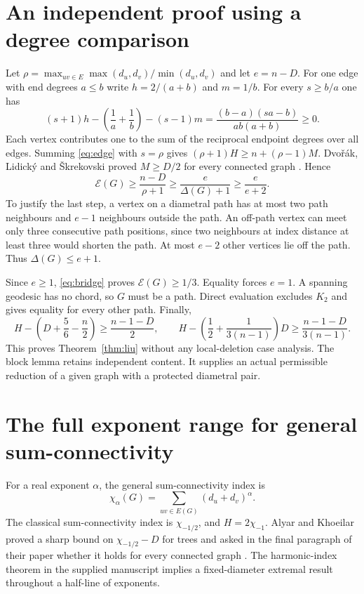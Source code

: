 \documentclass[11pt,a4paper]{article}
\newcommand{\gap}{\mathcal{E}}
\begin{document}
\section{An independent proof using a degree comparison}\label{sec:indep}
Let $\rho=\max_{uv\in E}\max(d_u,d_v)/\min(d_u,d_v)$ and let $e=n-D$. For one edge with end degrees $a\le b$ write $h=2/(a+b)$ and $m=1/b$. For every $s\ge b/a$ one has
\begin{equation}\label{eq:edge}
 (s+1)h-\left(\frac1a+\frac1b\right)-(s-1)m
 =\frac{(b-a)(sa-b)}{ab(a+b)}\ge0 .
\end{equation}
Each vertex contributes one to the sum of the reciprocal endpoint degrees over all edges. Summing \eqref{eq:edge} with $s=\rho$ gives $(\rho+1)H\ge n+(\rho-1)M$. Dvo\v r\'ak, Lidick\'y and \v Skrekovski proved $M\ge D/2$ for every connected graph \cite[Thm.~3]{dls}. Hence
\begin{equation}\label{eq:bridge}
 \gap(G)\ge\frac{n-D}{\rho+1}\ge\frac{e}{\Delta(G)+1}\ge\frac{e}{e+2}.
\end{equation}
To justify the last step, a vertex on a diametral path has at most two path neighbours and $e-1$ neighbours outside the path. An off-path vertex can meet only three consecutive path positions, since two neighbours at index distance at least three would shorten the path. At most $e-2$ other vertices lie off the path. Thus $\Delta(G)\le e+1$.
 
Since $e\ge1$, \eqref{eq:bridge} proves $\gap(G)\ge1/3$. Equality forces $e=1$. A spanning geodesic has no chord, so $G$ must be a path. Direct evaluation excludes $K_2$ and gives equality for every other path. Finally,
\[
 H-\left(D+\frac56-\frac n2\right)\ge\frac{n-1-D}{2},
 \qquad H-\left(\frac12+\frac{1}{3(n-1)}\right)D
     \ge\frac{n-1-D}{3(n-1)} .
\]
This proves Theorem~\ref{thm:liu} without any local-deletion case analysis. The block lemma retains independent content. It supplies an actual permissible reduction of a given graph with a protected diametral pair.

\section{The full exponent range for general sum-connectivity}\label{sec:sumfamily}
For a real exponent $\alpha$, the general sum-connectivity index is
\[
   \chi_\alpha(G)=\sum_{uv\in E(G)}(d_u+d_v)^\alpha .
\]
The classical sum-connectivity index is $\chi_{-1/2}$, and $H=2\chi_{-1}$. Alyar and Khoeilar proved a sharp bound on $\chi_{-1/2}-D$ for trees and asked in the final paragraph of their paper whether it holds for every connected graph \cite{alyar}. The harmonic-index theorem in the supplied manuscript implies a fixed-diameter extremal result throughout a half-line of exponents.
\end{document}
